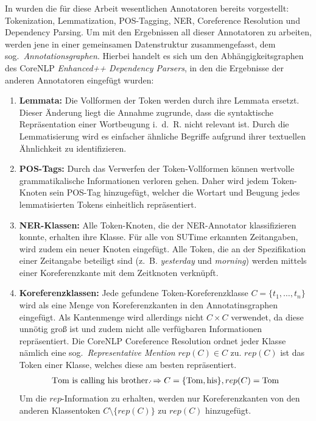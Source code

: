 In  wurden die für diese Arbeit wesentlichen Annotatoren bereits vorgestellt: Tokenization, Lemmatization, POS-Tagging, NER, Coreference Resolution und Dependency Parsing.
Um mit den Ergebnissen all dieser Annotatoren zu arbeiten, werden jene in einer gemeinsamen Datenstruktur zusammengefasst, dem sog.\ \textit{Annotations\-graphen}.
Hierbei handelt es sich um den Abhängigkeitsgraphen des CoreNLP \textit{Enhanced++ Dependency Parsers}, in den die Ergebnisse der anderen Annotatoren eingefügt wurden:
\begin{enumerate}
	\item \textbf{Lemmata:}
		Die Vollformen der Token werden durch ihre Lemmata ersetzt.
		Dieser Änderung liegt die Annahme zugrunde, dass die syntaktische Repräsentation einer Wortbeugung i.~d.~R. nicht relevant ist.
		Durch die Lemmatisierung wird es einfacher ähnliche Begriffe aufgrund ihrer textuellen Ähnlichkeit zu identifizieren.
	\item \textbf{POS-Tags:}
		Durch das Verwerfen der Token-Vollformen können wertvolle grammatikalische Informationen verloren gehen.
		Daher wird jedem Token-Knoten sein POS-Tag hinzugefügt, welcher die Wortart und Beugung jedes lemmatisierten Tokens einheitlich repräsentiert.
	\item \textbf{NER-Klassen:}
		Alle Token-Knoten, die der NER-Annotator klassifizieren konnte, erhalten ihre Klasse.
		Für alle von SUTime erkannten Zeitangaben, wird zudem ein neuer Knoten eingefügt.
		Alle Token, die an der Spezifikation einer Zeitangabe beteiligt sind (z.~B. \textit{yesterday} und \textit{morning}) werden mittels einer Koreferenzkante mit dem Zeitknoten verknüpft.
	\item \textbf{Koreferenzklassen:}
		Jede gefundene Token-Koreferenzklasse $C = \{t_1, \dots, t_n\}$ wird als eine Menge von Koreferenzkanten in den Annotatinsgraphen eingefügt.
		Als Kantenmenge wird allerdings nicht $C \times C$ verwendet, da diese unnötig groß ist und zudem nicht alle verfügbaren Informationen repräsentiert.
		Die CoreNLP Coreference Resolution ordnet jeder Klasse nämlich eine sog.\ \textit{Representative Mention} $rep(C) \in C$ zu.
		$rep(C)$ ist das Token einer Klasse, welches diese am besten repräsentiert.
		\begin{align*}
			\text{T}\tikzmark{toma}\text{om is calling hi}\tikzmark{tomb}\text{s brother.}
			\begin{tikzpicture}[overlay,remember picture]
				\draw[-,shorten >=3pt,shorten <=3pt] (toma.center) to[bend right] (tomb.center);
			\end{tikzpicture}
			\Rightarrow
			C = \{\text{Tom}, \text{his}\}, rep(C) = \text{Tom}
		\end{align*}
		Um die $rep$-Information zu erhalten, werden nur Koreferenzkanten von den anderen Klassentoken $C \setminus \{rep(C)\}$ zu $rep(C)$ hinzugefügt.
\end{enumerate}

